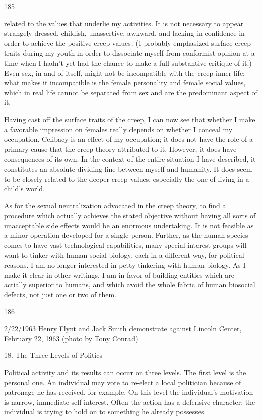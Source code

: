 \documentclass[10pt,twoside]{memoir}
\begin{document}
\begin{enumerate}
{\begin{enumerate}
\begin{sysrules}
\begin{sysrules}
\begin{sysrules}
\begin{sysrules}
{\begin{enumerate}
{{{{{{{{185 


related to the values that underlie my activities. It is not necessary to appear 
strangely dressed, childish, unassertive, awkward, and lacking in confidence 
in order to achieve the positive creep values. (1 probably emphasized surface 
creep traits during my youth in order to dissociate myself from conformist 
opinion at a time when I hadn't yet had the chance to make a full 
substantive critique of it.) Even sex, in and of itself, might not be 
incompatible with the creep inner life; what makes it incompatible is the 
female personality and female social values, which in real life cannot be 
separated from sex and are the predominant aspect of it. 


Having cast off the surface traits of the creep, I can now see that 
whether I make a favorable impression on females really depends on whether 
I conceal my occupation. Celibacy is an effect of my occupation; it does not 
have the role of a primary cause that the creep theory attributed to it. 
However, it does have consequences of its own. In the context of the entire 
situation I have described, it constitutes an absolute dividing line between 
myself and humanity. It does seem to be closely related to the deeper creep 
values, especially the one of living in a child's world. 

As for the sexual neutralization advocated in the creep theory, to find a 
procedure which actually achieves the stated objective without having all 
sorts of unacceptable side effects would be an enormous undertaking. It is 
not feasible as a minor operation developed for a single person. Further, as 
the human species comes to have vast technological capabilities, many 
special interest groups will want to tinker with human social biology, each in 
a different way, for political reasons. I am no longer interested in petty 
tinkering with human biology. As I make it clear in other writings, I am in 
favor of building entities which are actially superior to humans, and which 
avoid the whole fabric of human biosocial defects, not just one or two of 
them. 


186 


2/22/1963 
Henry Flynt and Jack Smith demonstrate against Lincoln Center, February 22, 1963 
(photo by Tony Conrad) 


18. The Three Levels of Politics 


Political activity and its results can occur on three levels. The first level 
is the personal one. An individual may vote to re-elect a local politician 
because of patronage he has received, for example. On this level the 
individual's motivation is narrow, immediate self-interest. Often the action 
has a defensive character; the individual is trying to hold on to something he 
already possesses. 

}}}}}}}}
\end{enumerate}}
\end{sysrules}
\end{sysrules}
\end{sysrules}
\end{sysrules}
\end{enumerate}}
\end{enumerate}
\end{document}
